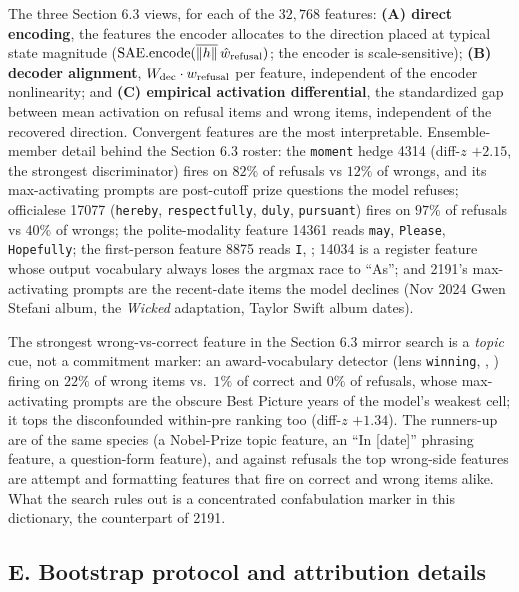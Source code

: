 The three Section 6.3 views, for each of the \(32{,}768\) features:
\textbf{(A) direct encoding}, the features the encoder allocates to the
direction placed at typical state magnitude
(\(\mathrm{SAE.encode}(\overline{\|h\|}\, \hat{w}_{\rm refusal})\);
the encoder is scale-sensitive); \textbf{(B) decoder alignment},
\(W_{\rm dec} \cdot w_{\rm refusal}\) per feature, independent of the
encoder nonlinearity; and \textbf{(C) empirical activation
differential}, the standardized gap between mean activation on refusal
items and wrong items, independent of the recovered direction.
Convergent features are the most interpretable. Ensemble-member detail
behind the Section 6.3 roster: the \texttt{moment} hedge 4314
(diff-\(z\) \(+2.15\), the strongest discriminator) fires on \(82\%\) of
refusals vs \(12\%\) of wrongs, and its max-activating prompts are
post-cutoff prize questions the model refuses; officialese 17077
(\texttt{hereby}, \texttt{respectfully}, \texttt{duly},
\texttt{pursuant}) fires on \(97\%\) of refusals vs \(40\%\) of
wrongs; the
polite-modality feature 14361 reads \texttt{may}, \texttt{Please},
\texttt{Hopefully}; the first-person feature 8875 reads \texttt{I},
\texttt{}; 14034 is a register feature whose output vocabulary always
loses the argmax race to ``As''; and 2191's max-activating prompts are
the recent-date items the model declines (Nov 2024 Gwen Stefani album,
the \emph{Wicked} adaptation, Taylor Swift album dates).

The strongest wrong-vs-correct feature in the Section 6.3 mirror search
is a \emph{topic} cue, not a commitment marker: an award-vocabulary
detector (lens \texttt{winning}, \texttt{}, \texttt{}) firing
on \(22\%\) of wrong items vs.~\(1\%\) of correct and \(0\%\) of
refusals, whose max-activating prompts are the obscure Best Picture
years of the model's weakest cell; it tops the disconfounded within-pre
ranking too (diff-\(z\) \(+1.34\)). The runners-up are of the same
species (a Nobel-Prize topic feature, an ``In {[}date{]}'' phrasing
feature, a question-form feature), and against refusals the top
wrong-side features are attempt and formatting features that fire on
correct and wrong items alike. What the search rules out is a concentrated confabulation marker in this dictionary, the counterpart of 2191.

\subsection{E. Bootstrap protocol and attribution
details}\label{e.-bootstrap-protocol-and-attribution-details}

